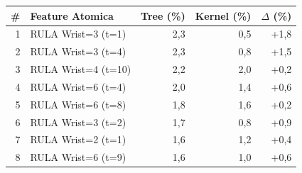 \begin{tabular*}{\linewidth}{@{}r@{\extracolsep{\fill}}lrrr@{}}
\toprule
\textbf{\#} & \textbf{Feature Atomica} & \textbf{Tree (\%)} & \textbf{Kernel (\%)} & \textbf{$\Delta$ (\%)} \\
\midrule
1 & RULA Wrist=3 (t=1) & 2{,}3 & 0{,}5 & +1{,}8 \\
2 & RULA Wrist=3 (t=4) & 2{,}3 & 0{,}8 & +1{,}5 \\
3 & RULA Wrist=4 (t=10) & 2{,}2 & 2{,}0 & +0{,}2 \\
4 & RULA Wrist=6 (t=4) & 2{,}0 & 1{,}4 & +0{,}6 \\
5 & RULA Wrist=6 (t=8) & 1{,}8 & 1{,}6 & +0{,}2 \\
6 & RULA Wrist=3 (t=2) & 1{,}7 & 0{,}8 & +0{,}9 \\
7 & RULA Wrist=2 (t=1) & 1{,}6 & 1{,}2 & +0{,}4 \\
8 & RULA Wrist=6 (t=9) & 1{,}6 & 1{,}0 & +0{,}6 \\
\bottomrule
\end{tabular*}
